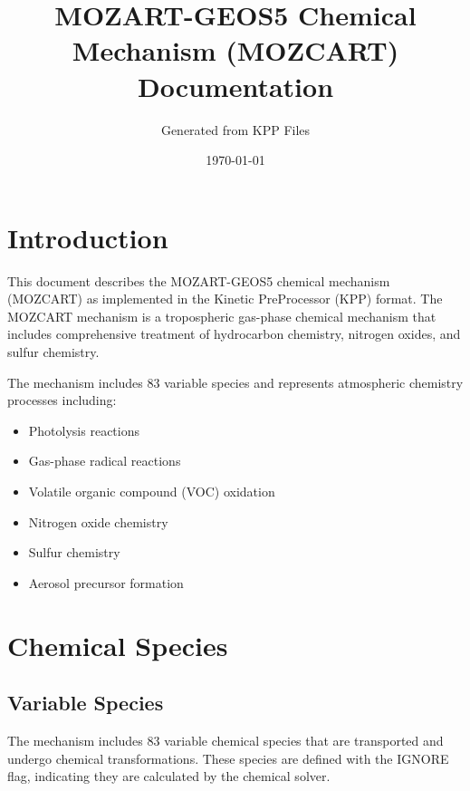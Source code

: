 \documentclass[12pt,a4paper]{article}
\title{MOZART-GEOS5 Chemical Mechanism (MOZCART) Documentation}
\author{Generated from KPP Files}
\date{\today}
\begin{document}
\maketitle

\tableofcontents

\newpage

\section{Introduction}

This document describes the MOZART-GEOS5 chemical mechanism (MOZCART) as implemented in the Kinetic PreProcessor (KPP) format. The MOZCART mechanism is a tropospheric gas-phase chemical mechanism that includes comprehensive treatment of hydrocarbon chemistry, nitrogen oxides, and sulfur chemistry.

The mechanism includes 83 variable species and represents atmospheric chemistry processes including:
\begin{itemize}
    \item Photolysis reactions
    \item Gas-phase radical reactions
    \item Volatile organic compound (VOC) oxidation
    \item Nitrogen oxide chemistry
    \item Sulfur chemistry
    \item Aerosol precursor formation
\end{itemize}

\section{Chemical Species}

\subsection{Variable Species}

The mechanism includes 83 variable chemical species that are transported and undergo chemical transformations. These species are defined with the IGNORE flag, indicating they are calculated by the chemical solver.
\end{document}
